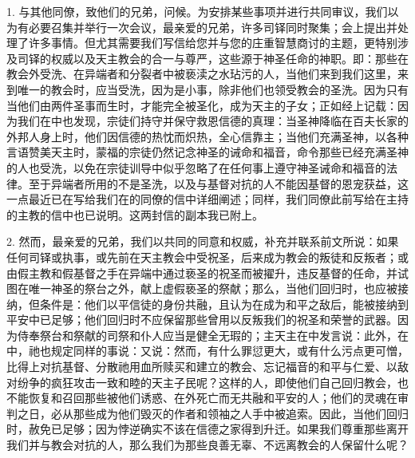 1. 与其他同僚，致他们的兄弟，问候。为安排某些事项并进行共同审议，我们以为有必要召集并举行一次会议，最亲爱的兄弟，许多司铎同时聚集；会上提出并处理了许多事情。但尤其需要我们写信给您并与您的庄重智慧商讨的主题，更特别涉及司铎的权威以及天主教会的合一与尊严，这些源于神圣任命的神职。即：那些在教会外受洗、在异端者和分裂者中被亵渎之水玷污的人，当他们来到我们这里，来到唯一的教会时，应当受洗，因为是小事，除非他们也领受教会的圣洗。因为只有当他们由两件圣事而生时，才能完全被圣化，成为天主的子女；正如经上记载：因为我们在中也发现，宗徒们持守并保守救恩信德的真理：当圣神降临在百夫长家的外邦人身上时，他们因信德的热忱而炽热，全心信靠主；当他们充满圣神，以各种言语赞美天主时，蒙福的宗徒仍然记念神圣的诫命和福音，命令那些已经充满圣神的人也受洗，以免在宗徒训导中似乎忽略了在任何事上遵守神圣诫命和福音的法律。至于异端者所用的不是圣洗，以及与基督对抗的人不能因基督的恩宠获益，这一点最近已在写给我们在的同僚的信中详细阐述；同样，我们同僚此前写给在主持的主教的信中也已说明。这两封信的副本我已附上。\par

2. 然而，最亲爱的兄弟，我们以共同的同意和权威，补充并联系前文所说：如果任何司铎或执事，或先前在天主教会中受祝圣，后来成为教会的叛徒和反叛者；或由假主教和假基督之手在异端中通过亵圣的祝圣而被擢升，违反基督的任命，并试图在唯一神圣的祭台之外，献上虚假亵圣的祭献；那么，当他们回归时，也应被接纳，但条件是：他们以平信徒的身份共融，且认为在成为和平之敌后，能被接纳到平安中已足够；他们回归时不应保留那些曾用以反叛我们的祝圣和荣誉的武器。因为侍奉祭台和祭献的司祭和仆人应当是健全无瑕的；主天主在中发言说：此外，在中，祂也规定同样的事说：又说：然而，有什么罪愆更大，或有什么污点更可憎，比得上对抗基督、分散祂用血所赎买和建立的教会、忘记福音的和平与仁爱、以敌对纷争的疯狂攻击一致和睦的天主子民呢？这样的人，即使他们自己回归教会，也不能恢复和召回那些被他们诱惑、在外死亡而无共融和平安的人；他们的灵魂在审判之日，必从那些成为他们毁灭的作者和领袖之人手中被追索。因此，当他们回归时，赦免已足够；因为悖逆确实不该在信德之家得到升迁。如果我们尊重那些离开我们并与教会对抗的人，那么我们为那些良善无辜、不远离教会的人保留什么呢？\par

